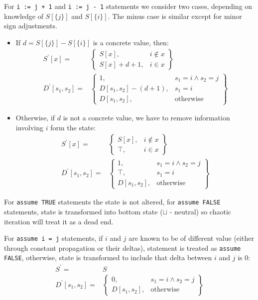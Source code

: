 For \texttt{i := j + 1} and \texttt{i := j - 1} statements we consider two cases, depending on knowledge of $S[\{j\}]$ and $S[\{i\}]$. The minus case is similar except for minor sign adjustments.
\begin{itemize}
\item If $d=S[\{j\}]-S[\{i\}]$ is a concrete value, then:
\begin{align*}
S^\prime[x] = & \left.
	\begin{cases}
		S[x], & i \notin x \\
		S[x] + d + 1, & i \in x
	\end{cases}
\right\}\\
D^\prime[s_1, s_2] = & \left.
	\begin{cases}
		1, & s_1 = i \wedge s_2 = j \\
		D[s_1,s_2] - (d + 1), & s_1 = i \\
		D[s_1,s_2], & \text{otherwise}
	\end{cases}
\right\}
\end{align*}
\item Otherwise, if $d$ is not a concrete value, we have to remove information involving $i$ form the state:
\begin{align*}
S^\prime[x] = & \left.
	\begin{cases}
		S[x], & i \notin x \\
		\top, & i \in x
	\end{cases}
\right\}\\
D^\prime[s_1, s_2] = & \left.
	\begin{cases}
		1, & s_1 = i \wedge s_2 = j \\
		\top, & s_1 = i \\
		D[s_1,s_2], & \text{otherwise}
	\end{cases}
\right\}
\end{align*}
\end{itemize}


For \texttt{assume TRUE} statements the state is not altered, for \texttt{assume FALSE} statements, state is transformed into bottom state ($\sqcup$ - neutral) so chaotic iteration will treat it as a dead end.

For \texttt{assume i = j} statements, if $i$ and $j$ are known to be of different value (either through constant propagation or their deltas), statement is treated as \texttt{assume FALSE}, otherwise, state is transformed to include that delta between $i$ and $j$ is 0:
\begin{align*}
S^\prime = & S \\
D^\prime[s_1, s_2] = & \left.
	\begin{cases}
		0, & s_1 = i \wedge s_2 = j \\
		D[s_1,s_2], & \text{otherwise}
	\end{cases}
\right\}
\end{align*}


